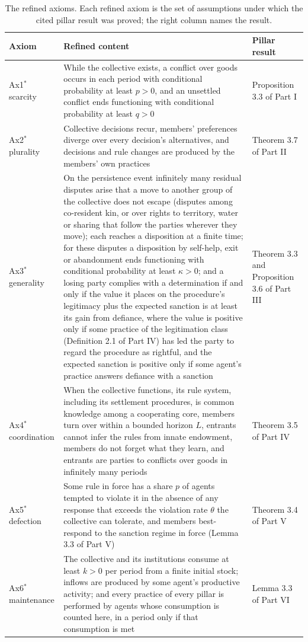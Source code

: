 \documentclass[11pt,letterpaper]{article}
\theoremstyle{definition}
\theoremstyle{remark}
\begin{document}
\begin{table}[!htbp]
\centering
\small
\caption{The refined axioms. Each refined axiom is the set of assumptions under which the cited pillar result was proved; the right column names the result.}
\label{tab:axioms}
\begin{tabularx}{\textwidth}{@{}L{1.7cm}YL{2.6cm}@{}}
\toprule
Axiom & Refined content & Pillar result \\
\midrule
Ax1$^{*}$ scarcity & While the collective exists, a conflict over goods occurs in each period with conditional probability at least $p>0$, and an unsettled conflict ends functioning with conditional probability at least $q>0$ & Proposition 3.3 of Part I \\
Ax2$^{*}$ plurality & Collective decisions recur, members' preferences diverge over every decision's alternatives, and decisions and rule changes are produced by the members' own practices & Theorem 3.7 of Part II \\
Ax3$^{*}$ generality & On the persistence event infinitely many residual disputes arise that a move to another group of the collective does not escape (disputes among co-resident kin, or over rights to territory, water or sharing that follow the parties wherever they move); each reaches a disposition at a finite time; for these disputes a disposition by self-help, exit or abandonment ends functioning with conditional probability at least $\kappa>0$; and a losing party complies with a determination if and only if the value it places on the procedure's legitimacy plus the expected sanction is at least its gain from defiance, where the value is positive only if some practice of the legitimation class (Definition 2.1 of Part IV) has led the party to regard the procedure as rightful, and the expected sanction is positive only if some agent's practice answers defiance with a sanction & Theorem 3.3 and Proposition 3.6 of Part III \\
Ax4$^{*}$ coordination & When the collective functions, its rule system, including its settlement procedures, is common knowledge among a cooperating core, members turn over within a bounded horizon $L$, entrants cannot infer the rules from innate endowment, members do not forget what they learn, and entrants are parties to conflicts over goods in infinitely many periods & Theorem 3.5 of Part IV \\
Ax5$^{*}$ defection & Some rule in force has a share $p$ of agents tempted to violate it in the absence of any response that exceeds the violation rate $\theta$ the collective can tolerate, and members best-respond to the sanction regime in force (Lemma 3.3 of Part V) & Theorem 3.4 of Part V \\
Ax6$^{*}$ maintenance & The collective and its institutions consume at least $k>0$ per period from a finite initial stock; inflows are produced by some agent's productive activity; and every practice of every pillar is performed by agents whose consumption is counted here, in a period only if that consumption is met & Lemma 3.3 of Part VI \\
\bottomrule
\end{tabularx}
\end{table}
\end{document}
